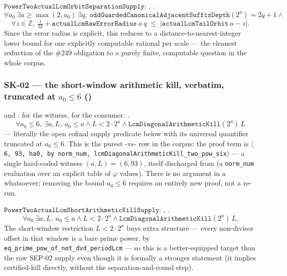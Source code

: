 \begin{defn}
$\mathtt{PowerTwoActualLcmOrbitSeparationSupply}$: , .
\[
  \forall a_0\ \exists a\ge\max(2,a_0)\ \exists q,\
  \mathtt{oddGuardedCanonicalAdjacentSuffixDepth}(2^a)=2q{+}1 \wedge
\]
\[
  \forall z\in\mathbb Z,\ \tfrac1{32} + \mathtt{actualLcmRawErrorRadius}\ a\ q \;\le\;
  |\mathtt{actualLcmTailOrbit}\ a - z| .
\]
Since the error radius is explicit, this reduces to a distance-to-nearest-integer lower bound for
one explicitly computable rational per scale --- the cleanest reduction of the \#249 obligation to
a purely finite, computable question in the whole corpus.
\end{defn}

\subsubsection{SK-02 --- the short-window arithmetic kill, verbatim, truncated at $a_0\le 6$ ()}

\begin{thm}
and
.
\ev{Cert} for the witness, \ev{Lean} for the consumer. \scale{bounded}.
\[
  \forall a_0\le 6,\ \exists a,L,\ a_0\le a \wedge L < 2\cdot 2^a \wedge
  \mathtt{LcmDiagonalArithmeticKill}(2^a)\,L
\]
--- literally the open cofinal supply predicate below with its universal quantifier truncated at
$a_0\le 6$. This is the purest \scale{fixed}-vs-\scale{cofinal} row in the corpus: the proof term is
$\langle$\texttt{6, 93, ha0, by norm\_num, lcmDiagonalArithmeticKill\_two\_pow\_six}$\rangle$ --- a single
hard-coded witness $(a,L)=(6,93)$, itself discharged from
 (a
\texttt{norm\_num} evaluation over an explicit table of $\varphi$ values). There is no argument in
$a$ whatsoever; removing the bound $a_0\le 6$ requires an entirely new proof, not a re-run.
\end{thm}

\begin{defn}
$\mathtt{PowerTwoActualLcmShortArithmeticKillSupply}$: , .
\[
  \forall a_0\ \exists a,L,\ a_0\le a \wedge L < 2\cdot 2^a \wedge
  \mathtt{LcmDiagonalArithmeticKill}(2^a)\,L .
\]
The short-window restriction $L<2\cdot 2^a$ buys extra structure --- every non-divisor offset in
that window is a bare prime power, by \texttt{eq\_prime\_pow\_of\_not\_dvd\_periodLcm} --- so this
is a better-equipped target than the raw SEP-02 supply even though it is formally a stronger
statement (it implies certified-kill directly, without the separation-and-round step).
\end{defn}

